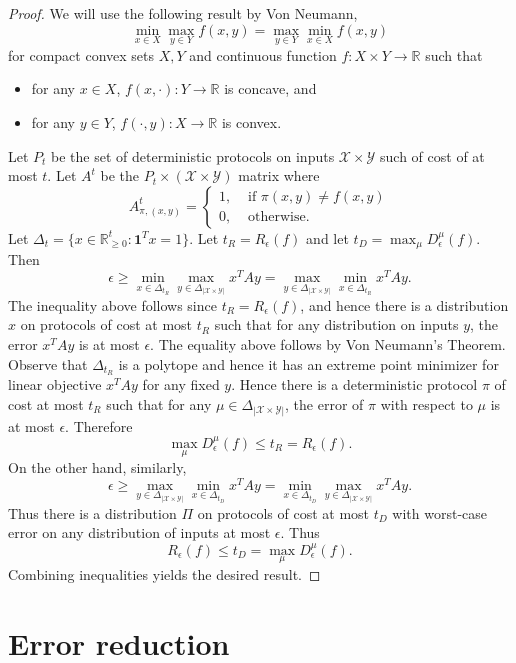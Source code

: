 \documentclass[11pt]{amsart}
\theoremstyle{plain}
\theoremstyle{definition}
\theoremstyle{plain}
\newcommand{\calX}{\mathcal{X}}
\newcommand{\calY}{\mathcal{Y}}
\newcommand{\R}{\mathbb{R}}
\begin{document}
\begin{proof}
We will use the following result by Von Neumann,
$$\min_{x\in X}\max_{y\in Y} f(x,y) = \max_{y \in Y} \min_{x \in X} f(x,y)$$
for compact convex sets $X,Y$ and continuous function $f: X\times Y \rightarrow \R$ such that 
\begin{itemize}
    \item for any $x \in X$, $f(x,\cdot): Y\rightarrow \R$ is concave, and
    \item for any $y \in Y$, $f(\cdot, y): X\rightarrow \R$ is convex.
\end{itemize}
Let $P_t$ be the set of deterministic protocols on inputs $\calX \times \calY$ such of cost of at most $t$. Let $A^t$ be the $P_t \times (\calX\times\calY)$ matrix where 
$$A^t_{\pi, (x,y)} = \begin{cases}
1, &\text{ if } \pi(x,y) \neq f(x,y) \\
0, &\text{ otherwise.}
\end{cases}$$
Let $\Delta_t = \{x \in \R^t_{\geq 0} : \mathbf{1}^Tx = 1\}$. Let $t_R = R_\epsilon(f)$ and let $t_D = \max_\mu D^\mu_\epsilon(f).$ Then
$$\epsilon \geq \min_{x \in \Delta_{t_R}} \max_{y \in \Delta_{|\calX\times\calY|}}x^TAy =\max_{y \in \Delta_{|\calX\times\calY|}} \min_{x \in \Delta_{t_R}} x^TAy.$$
The inequality above follows since $t_R = R_\epsilon (f)$, and hence there is a distribution $x$ on protocols of cost at  most $t_R$ such that for any distribution on inputs $y$, the error $x^TAy$ is at most $\epsilon$. The equality above follows by Von Neumann's Theorem. Observe that $\Delta_{t_R}$ is a polytope and hence it has an extreme point minimizer for linear objective $x^TAy$ for any fixed $y$. Hence there is a deterministic protocol $\pi$ of cost at most $t_R$ such that for any $\mu \in \Delta_{|\calX\times \calY|}$, the error of $\pi$ with respect to $\mu$ is at most $\epsilon$. Therefore
$$\max_{\mu} D^\mu_{\epsilon}(f) \leq t_R = R_\epsilon(f).$$ 
On the other hand, similarly,
$$\epsilon \geq \max_{y \in \Delta_{|\calX\times\calY|}} \min_{x \in \Delta_{t_D}} x^TAy  =  \min_{x \in \Delta_{t_D}} \max_{y \in \Delta_{|\calX\times\calY|}}x^TAy.$$
Thus there is a distribution $\Pi$ on protocols of cost at most $t_D$ with worst-case error on any distribution of inputs at most $\epsilon$. Thus
$$R_\epsilon(f) \leq t_D = \max_\mu D^\mu_\epsilon(f).$$
Combining inequalities yields the desired result.
\end{proof}


\newpage 
\section{Error reduction}
\end{document}
